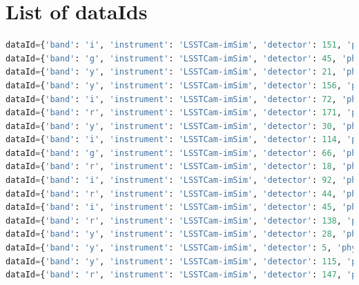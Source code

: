 \documentclass[DM,authoryear,toc]{lsstdoc}
\begin{document}
\appendix
\section{List of dataIds}
\label{app:ids}
\begin{lstlisting}[language=Python, basicstyle=\tiny]
dataId={'band': 'i', 'instrument': 'LSSTCam-imSim', 'detector': 151, 'physical_filter': 'i_sim_1.4', 'visit': 1030665} records=None
dataId={'band': 'g', 'instrument': 'LSSTCam-imSim', 'detector': 45, 'physical_filter': 'g_sim_1.4', 'visit': 1039948} records=None
dataId={'band': 'y', 'instrument': 'LSSTCam-imSim', 'detector': 21, 'physical_filter': 'y_sim_1.4', 'visit': 1010524} records=None
dataId={'band': 'y', 'instrument': 'LSSTCam-imSim', 'detector': 156, 'physical_filter': 'y_sim_1.4', 'visit': 1012086} records=None
dataId={'band': 'i', 'instrument': 'LSSTCam-imSim', 'detector': 72, 'physical_filter': 'i_sim_1.4', 'visit': 1030670} records=None
dataId={'band': 'r', 'instrument': 'LSSTCam-imSim', 'detector': 171, 'physical_filter': 'r_sim_1.4', 'visit': 1006059} records=None
dataId={'band': 'y', 'instrument': 'LSSTCam-imSim', 'detector': 30, 'physical_filter': 'y_sim_1.4', 'visit': 647595} records=None
dataId={'band': 'i', 'instrument': 'LSSTCam-imSim', 'detector': 114, 'physical_filter': 'i_sim_1.4', 'visit': 1013711} records=None
dataId={'band': 'g', 'instrument': 'LSSTCam-imSim', 'detector': 66, 'physical_filter': 'g_sim_1.4', 'visit': 1019980} records=None
dataId={'band': 'r', 'instrument': 'LSSTCam-imSim', 'detector': 18, 'physical_filter': 'r_sim_1.4', 'visit': 1052891} records=None
dataId={'band': 'i', 'instrument': 'LSSTCam-imSim', 'detector': 92, 'physical_filter': 'i_sim_1.4', 'visit': 1030665} records=None
dataId={'band': 'r', 'instrument': 'LSSTCam-imSim', 'detector': 44, 'physical_filter': 'r_sim_1.4', 'visit': 1052890} records=None
dataId={'band': 'i', 'instrument': 'LSSTCam-imSim', 'detector': 45, 'physical_filter': 'i_sim_1.4', 'visit': 1013734} records=None
dataId={'band': 'r', 'instrument': 'LSSTCam-imSim', 'detector': 138, 'physical_filter': 'r_sim_1.4', 'visit': 1052890} records=None
dataId={'band': 'y', 'instrument': 'LSSTCam-imSim', 'detector': 28, 'physical_filter': 'y_sim_1.4', 'visit': 1032264} records=None
dataId={'band': 'y', 'instrument': 'LSSTCam-imSim', 'detector': 5, 'physical_filter': 'y_sim_1.4', 'visit': 1032264} records=None
dataId={'band': 'y', 'instrument': 'LSSTCam-imSim', 'detector': 115, 'physical_filter': 'y_sim_1.4', 'visit': 646755} records=None
dataId={'band': 'r', 'instrument': 'LSSTCam-imSim', 'detector': 147, 'physical_filter': 'r_sim_1.4', 'visit': 1049332} records=None

\end{lstlisting}
\end{document}
